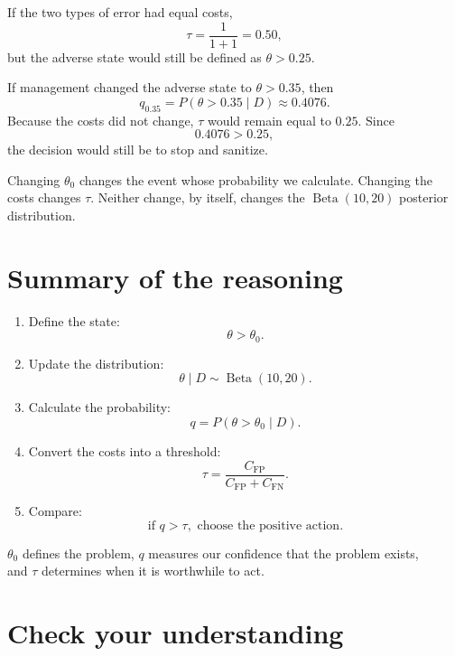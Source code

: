 \documentclass[11pt,letter]{article}
\newcommand{\CFP}{C_{\mathrm{FP}}}
\newcommand{\CFN}{C_{\mathrm{FN}}}
\begin{document}
If the two types of error had equal costs,
\[
\tau=\frac{1}{1+1}=0.50,
\]
but the adverse state would still be defined as $\theta>0.25$.

If management changed the adverse state to $\theta>0.35$, then
\[
q_{0.35}=P(\theta>0.35\mid D)\approx0.4076.
\]
Because the costs did not change, $\tau$ would remain equal to $0.25$. Since
\[
0.4076>0.25,
\]
the decision would still be to stop and sanitize.

\begin{atencao}
Changing $\theta_0$ changes the event whose probability we calculate. Changing
the costs changes $\tau$. Neither change, by itself, changes the
$\operatorname{Beta}(10,20)$ posterior distribution.
\end{atencao}

\section{Summary of the reasoning}

\begin{enumerate}
  \item Define the state:
        \[
        \theta>\theta_0.
        \]

  \item Update the distribution:
        \[
        \theta\mid D\sim\operatorname{Beta}(10,20).
        \]

  \item Calculate the probability:
        \[
        q=P(\theta>\theta_0\mid D).
        \]

  \item Convert the costs into a threshold:
        \[
        \tau=\frac{\CFP}{\CFP+\CFN}.
        \]

  \item Compare:
        \[
        \text{if }q>\tau,\text{ choose the positive action.}
        \]
\end{enumerate}

\begin{ideia}
$\theta_0$ defines the problem, $q$ measures our
confidence that the problem exists,\\and $\tau$ determines when it is worthwhile
to act.
\end{ideia}

\section{Check your understanding}
\end{document}
